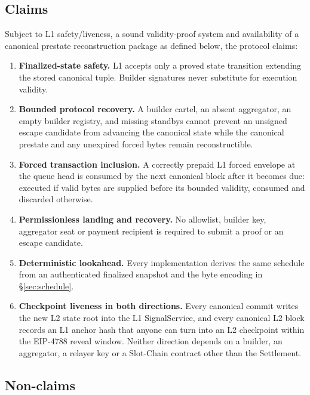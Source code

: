 \documentclass[a4paper,11pt]{article}
\begin{document}
\subsection{Claims}

Subject to L1 safety/liveness, a sound validity-proof system and availability
of a canonical prestate reconstruction package as defined below, the protocol
claims:

\begin{enumerate}
\item \textbf{Finalized-state safety.} L1 accepts only a proved state transition
  extending the stored canonical tuple.  Builder signatures never substitute
  for execution validity.
\item \textbf{Bounded protocol recovery.} A builder cartel, an absent
  aggregator, an empty builder registry, and missing standbys cannot prevent an
  unsigned escape candidate from advancing the canonical state while the
  canonical prestate and any unexpired forced bytes remain reconstructible.
\item \textbf{Forced transaction inclusion.} A correctly prepaid L1 forced
  envelope at the queue head is consumed by the next canonical block after it
  becomes due: executed if valid bytes are supplied before its bounded
  validity, consumed and discarded otherwise.
\item \textbf{Permissionless landing and recovery.} No allowlist, builder key,
  aggregator seat or payment recipient is required to submit a proof or an
  escape candidate.
\item \textbf{Deterministic lookahead.} Every implementation derives the same
  schedule from an authenticated finalized snapshot and the byte encoding in
  \S\ref{sec:schedule}.
\item \textbf{Checkpoint liveness in both directions.} Every canonical commit
  writes the new L2 state root into the L1 SignalService, and every canonical
  L2 block records an L1 anchor hash that anyone can turn into an L2 checkpoint
  within the EIP-4788 reveal window.  Neither direction depends on a builder,
  an aggregator, a relayer key or a Slot-Chain contract other than the
  Settlement.
\end{enumerate}

\subsection{Non-claims}
\end{document}
